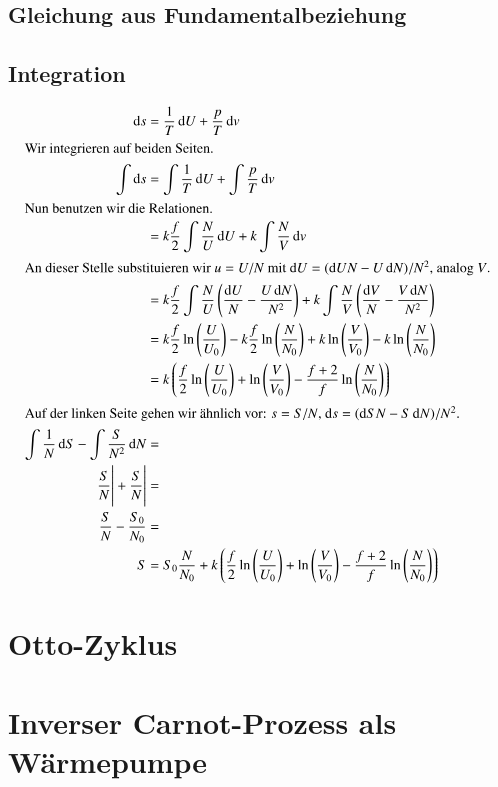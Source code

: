 \subsection{Gleichung aus Fundamentalbeziehung}

\subsection{Integration}

\begin{align*}
    \dif s &= \frac 1T \dif U + \frac pT \dif v \\
    \intertext{%
        Wir integrieren auf beiden Seiten.
    }
    \int \dif s &= \int \frac 1T \dif U + \int \frac pT \dif v \\
    \intertext{%
        Nun benutzen wir die Relationen.
    }
    &= k \frac f2 \int \frac NU \dif U + k \int \frac NV \dif v \\
    \intertext{%
        An dieser Stelle substituieren wir $u = U/N$ mit $\dif U = (\dif U N -
        U \dif N)/N^2$, analog $V$.
    }
    &= k \frac f2 \int \frac NU \del{\frac{\dif U}{N} - \frac{U \dif N}{N^2}} + k \int \frac NV \del{\frac{\dif V}{N} - \frac{V \dif N}{N^2}} \\
    &= k \frac f2 \ln\del{\frac U{U_0}} - k \frac f2 \ln\del{\frac N{N_0}} + k \ln\del{\frac V{V_0}} - k \ln\del{\frac N{N_0}} \\
    &= k \del{\frac f2 \ln\del{\frac U{U_0}} + \ln\del{\frac V{V_0}} - \frac{f + 2}f \ln\del{\frac N{N_0}}} \\
    \intertext{%
        Auf der linken Seite gehen wir ähnlich vor: $s = S/N$, $\dif s = (\dif
        S N - S \dif N)/N^2$.
    }
    \int \frac 1N \dif S - \int \frac S{N^2} \dif N &= \\
    \eval{\frac SN} + \eval{\frac SN} &= \\
    \frac SN - \frac{S_0}{N_0} &= \\
    S &= S_0 \frac{N}{N_0} + k \del{\frac f2 \ln\del{\frac U{U_0}} + \ln\del{\frac V{V_0}} - \frac{f + 2}f \ln\del{\frac N{N_0}}}
\end{align*}

\section{Otto-Zyklus}

\section{Inverser Carnot-Prozess als Wärmepumpe}

\subsection{}

\subsection{}


